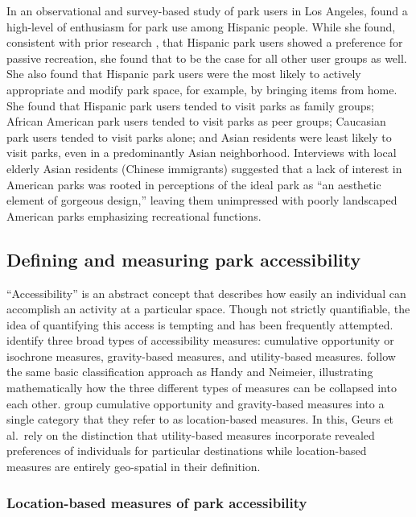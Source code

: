 \documentclass[3p, authoryear]{elsarticle} %
\begin{document}
In an observational and survey-based study of park users in Los Angeles,
\citet{loukaitou1995urban} found a high-level of enthusiasm for park use among Hispanic
people. While she found, consistent with prior research \citep{baas1993influence, hutchison1987ethnicity, irwin1990mexican}, that Hispanic park users showed a
preference for passive recreation, she found that to be the case for all other
user groups as well. She also found that Hispanic park users were the most
likely to actively appropriate and modify park space, for example, by bringing
items from home. She found that Hispanic park users tended to visit parks as
family groups; African American park users tended to visit parks as peer groups;
Caucasian park users tended to visit parks alone; and Asian residents were least
likely to visit parks, even in a predominantly Asian neighborhood. Interviews
with local elderly Asian residents (Chinese immigrants) suggested that a lack of
interest in American parks was rooted in perceptions of the ideal park as ``an
aesthetic element of gorgeous design,'' leaving them unimpressed with poorly
landscaped American parks emphasizing recreational functions.

\hypertarget{defining-and-measuring-park-accessibility}{%
\subsection{Defining and measuring park accessibility}\label{defining-and-measuring-park-accessibility}}

``Accessibility'' is an abstract concept that describes how easily an individual
can accomplish an activity at a particular space. Though not strictly
quantifiable, the idea of quantifying this access is tempting and has been
frequently attempted.
\citet{Handy1997} identify three broad types of accessibility measures: cumulative
opportunity or isochrone measures, gravity-based measures, and utility-based measures.
\citet{Dong2006} follow the same basic classification approach as Handy and Neimeier,
illustrating mathematically how the three different types of measures can be
collapsed into each other.
\citet{GEURS2004127} group cumulative opportunity and gravity-based measures into
a single category that they refer to as location-based measures. In this,
Geurs et al.~rely on the distinction that utility-based measures incorporate revealed
preferences of individuals for particular destinations while location-based
measures are entirely geo-spatial in their definition.

\hypertarget{location-based-measures-of-park-accessibility}{%
\subsubsection{Location-based measures of park accessibility}\label{location-based-measures-of-park-accessibility}}
\end{document}
